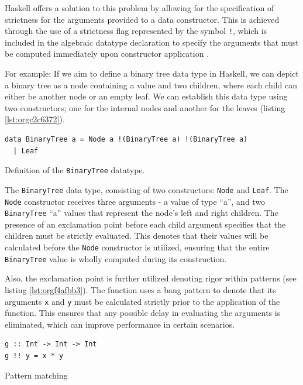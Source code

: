 \documentclass[a4paper, titlepage, twoside]{article}
\begin{document}
Haskell offers a solution to this problem by allowing for the specification of strictness for the arguments provided to a data constructor. This is achieved through the use of a strictness flag represented by the symbol \texttt{!}, which is included in the algebraic datatype declaration to specify the arguments that must be computed immediately upon constructor application \autocite{marlowHaskell2010Language2010,haskellwikiHaskellHaskellWiki2023}.

For example: If we aim to define a binary tree data type in Haskell, we can depict a binary tree as a node containing a value and two children, where each child can either be another node or an empty leaf. We can establish this data type using two constructors; one for the internal nodes and another for the leaves (listing \ref{lst:orgc2c6372}).

\begin{listing}[htbp]
\begin{verbatim}
data BinaryTree a = Node a !(BinaryTree a) !(BinaryTree a)
  | Leaf
\end{verbatim}
\caption{\label{lst:orgc2c6372}Definition of the \texttt{BinaryTree} datatype.}
\end{listing}

The \texttt{BinaryTree} data type, consisting of two constructors: \texttt{Node} and \texttt{Leaf}. The \texttt{Node} constructor receives three arguments - a value of type ``a'', and two \texttt{BinaryTree} ``a'' values that represent the node's left and right children. The presence of an exclamation point before each child argument specifies that the children must be strictly evaluated. This denotes that their values will be calculated before the \texttt{Node} constructor is utilized, ensuring that the entire \texttt{BinaryTree} value is wholly computed during its construction.

Also, the exclamation point is further utilized denoting rigor within patterns (see listing \ref{lst:orgf4afbb3}). The function uses a bang pattern to denote that its arguments \texttt{x} and \texttt{y} must be calculated strictly prior to the application of the function. This ensures that any possible delay in evaluating the arguments is eliminated, which can improve performance in certain scenarios.

\begin{listing}[htbp]
\begin{verbatim}
g :: Int -> Int -> Int
g !! y = x * y
\end{verbatim}
\caption{\label{lst:orgf4afbb3}Pattern matching}
\end{listing}
\end{document}
